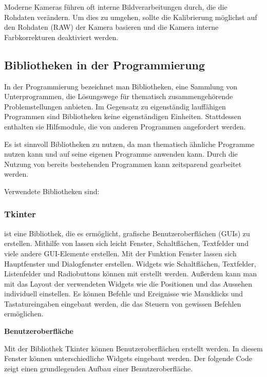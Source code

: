 {\begin{itemize}
        Moderne Kameras führen oft interne Bildverarbeitungen durch, die die \\Rohdaten verändern. Um dies zu umgehen, sollte die Kalibrierung möglichst auf den Rohdaten (RAW) der Kamera basieren und die Kamera interne \\Farbkorrekturen deaktiviert werden.
    \end{itemize}
    

    \subsection{Bibliotheken in der Programmierung}
    
In der Programmierung bezeichnet man Bibliotheken, eine Sammlung  von Unterprogrammen, die Lösungswege für thematisch zusammengehörende Problemstellungen anbieten. Im Gegensatz zu eigenständig lauffähigen Programmen sind Bibliotheken keine eigenständigen Einheiten. Stattdessen enthalten sie Hilfsmodule, die von anderen Programmen angefordert werden. 
    
    Es ist sinnvoll Bibliotheken zu nutzen, da man thematisch ähnliche Programme nutzen kann und auf seine eigenen Programme anwenden kann. Durch die Nutzung von bereits bestehenden Programmen kann zeitsparend gearbeitet werden.
    
    
\bigskip
    
    
    Verwendete Bibliotheken sind:


\subsubsection{Tkinter}
 ist eine Bibliothek, die es ermöglicht, grafische Benutzeroberflächen (GUIs) zu erstellen. Mithilfe von  lassen sich leicht Fenster, Schaltflächen, Textfelder und viele andere GUI-Elemente erstellen. Mit der Funktion Fenster lassen sich Hauptfenster und Dialogfenster erstellen. Widgets wie Schaltflächen, Textfelder, Listenfelder und Radiobuttons können mit  erstellt werden. Außerdem kann man mit  das Layout der verwendeten Widgets wie die Positionen und das Aussehen individuell einstellen. Es können Befehle und Ereignisse wie Mausklicks und Tastatureingaben eingebaut werden, die das Steuern von gewissen Befehlen ermöglichen. 

\bigskip

\textbf{Benutzeroberfläche}

Mit der Bibliothek Tkinter können Benutzeroberflächen erstellt werden. In diesem Fenster können unterschiedliche Widgets eingebaut werden. Der folgende Code zeigt einen grundlegenden Aufbau einer Benutzeroberfläche.

}
